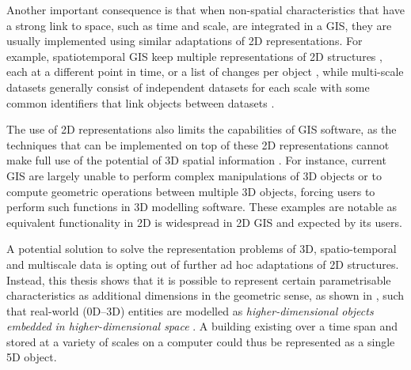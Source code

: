 
Another important consequence is that when non-spatial characteristics that have a strong link to space, such as time and scale, are integrated in a GIS, they are usually implemented using similar adaptations of 2D representations.
For example, spatiotemporal GIS keep multiple representations of 2D structures \citep{Armstrong88}, each at a different point in time, or a list of changes per object \citep{Worboys92,Peuquet94}, while multi-scale datasets generally consist of independent datasets for each scale with some common identifiers that link objects between datasets \citep{Friis-Christensen03,Stoter14}.


The use of 2D representations also limits the capabilities of GIS software, as the techniques that can be implemented on top of these 2D representations cannot make full use of the potential of 3D spatial information \citep[Ch.~3]{Zlatanova00}.
For instance, current GIS are largely unable to perform complex manipulations of 3D objects or to compute geometric operations between multiple 3D objects, forcing users to perform such functions in 3D modelling software.
These examples are notable as equivalent functionality in 2D is widespread in 2D GIS and expected by its users.


A potential solution to solve the representation problems of 3D, spatio-temporal and multiscale data is opting out of further ad hoc adaptations of 2D structures.
Instead, this thesis shows that it is possible to represent certain parametrisable characteristics as additional dimensions in the geometric sense, as shown in , such that real-world (0D--3D) entities are modelled as \emph{higher-dimensional objects embedded in higher-dimensional space} \citep{vanOosterom10}.
A building existing over a time span and stored at a variety of scales on a computer could thus be represented as a single 5D object.

